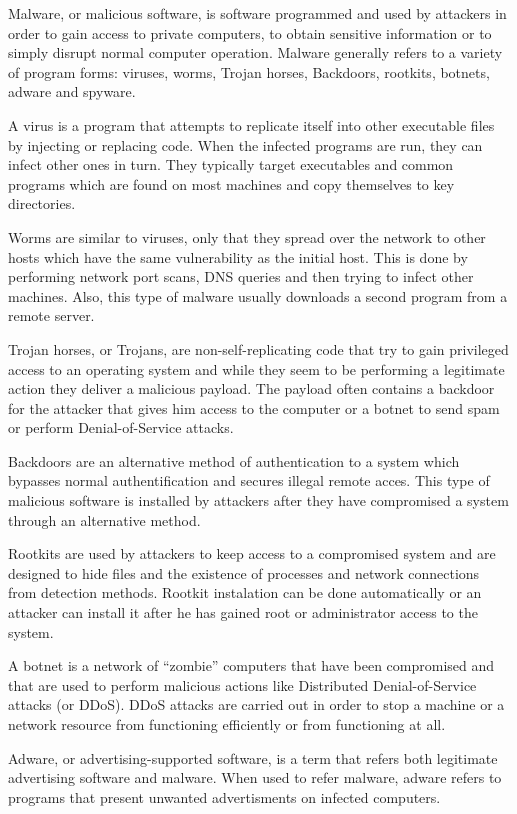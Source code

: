 Malware, or malicious software, is software programmed and used by attackers in order to gain access to private computers, to obtain sensitive information or to simply disrupt normal computer operation. Malware generally refers to a variety of program forms: viruses, worms, Trojan horses, Backdoors, rootkits, botnets, adware and spyware.

A virus is a program that attempts to replicate itself into other executable files by injecting or replacing code. When the infected programs are run, they can infect other ones in turn. They typically target executables and common programs which are found on most machines and copy themselves to key directories.

Worms are similar to viruses, only that they spread over the network to other hosts which have the same vulnerability as the initial host. This is done by performing network port scans, DNS queries and then trying to infect other machines. Also, this type of malware usually downloads a second program from a remote server.

Trojan horses, or Trojans, are non-self-replicating code that try to gain privileged access to an operating system and while they seem to be performing a legitimate action they deliver a malicious payload. The payload often contains a backdoor for the attacker that gives him access to the computer or a botnet to send spam or perform Denial-of-Service attacks.

Backdoors are an alternative method of authentication to a system which bypasses normal authentification and secures illegal remote acces. This type of malicious software is installed by attackers after they have compromised a system through an alternative method.

Rootkits are used by attackers to keep access to a compromised system and are designed to hide files and the existence of processes and network connections from detection methods. Rootkit instalation can be done automatically or an attacker can install it after he has gained root or administrator access to the system.

A botnet is a network of ``zombie'' computers that have been compromised and that are used to perform malicious actions like Distributed Denial-of-Service attacks (or DDoS). DDoS attacks are carried out in order to stop a machine or a network resource from functioning efficiently or from functioning at all.

Adware, or advertising-supported software, is a term that refers both legitimate advertising software and malware. When used to refer malware, adware refers to programs that present unwanted advertisments on infected computers.

